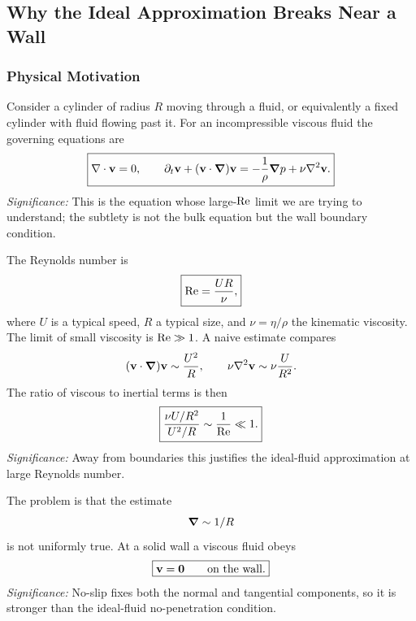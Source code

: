 \documentclass[../main.tex]{subfiles}
\begin{document}
\subsection{Why the Ideal Approximation Breaks Near a Wall}\label{sec:lec24:why-ideal-breaks}

\subsubsection*{Physical Motivation}
Consider a cylinder of radius $R$ moving through a fluid, or equivalently a
fixed cylinder with fluid flowing past it.  For an incompressible viscous fluid
the governing equations are
\begin{equation}
  \boxed{
  \nabla \cdot\mathbf{v}=0,\qquad
  \partial_t\mathbf{v}+(\mathbf{v}\cdot\grad)\mathbf{v}
  =-\frac{1}{\rho}\grad p+\nu\nabla^2\mathbf{v} .}
  \label{eq:lec24_incompressible_ns}
\end{equation}
\textit{Significance:} This is the equation whose large-$\mathrm{Re}$ limit we
are trying to understand; the subtlety is not the bulk equation but the wall
boundary condition.

The Reynolds number is
\begin{equation}
  \boxed{\mathrm{Re}=\frac{UR}{\nu},}
  \label{eq:lec24_reynolds}
\end{equation}
where $U$ is a typical speed, $R$ a typical size, and $\nu=\eta/\rho$ the
kinematic viscosity.  The limit of small viscosity is $\mathrm{Re}\gg1$.  A naive
estimate compares
\begin{equation}
  (\mathbf{v}\cdot\grad)\mathbf{v}\sim\frac{U^2}{R},
  \qquad
  \nu\nabla^2\mathbf{v}\sim\nu\frac{U}{R^2}.
  \label{eq:lec24_bulk_scaling}
\end{equation}
The ratio of viscous to inertial terms is then
\begin{equation}
  \boxed{
  \frac{\nu U/R^2}{U^2/R}\sim\frac{1}{\mathrm{Re}}\ll1 .}
  \label{eq:lec24_viscous_bulk_ratio}
\end{equation}
\textit{Significance:} Away from boundaries this justifies the ideal-fluid
approximation at large Reynolds number.

The problem is that the estimate
\[
  \grad\sim 1/R
\]
is not uniformly true.  At a solid wall a viscous fluid obeys
\begin{equation}
  \boxed{\mathbf{v}=\mathbf{0}\qquad\text{on the wall}.}
  \label{eq:lec24_no_slip}
\end{equation}
\textit{Significance:} No-slip fixes both the normal and tangential components,
so it is stronger than the ideal-fluid no-penetration condition.
\end{document}

